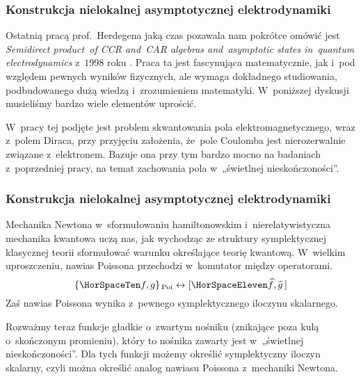 \documentclass[10pt,t]{beamer}
\begin{document}
\begin{frame}
  \frametitle{Konstrukcja nielokalnej asymptotycznej
    elektrodynamiki}


  Ostatnią pracą prof.~Herdegena jaką czas pozawala nam pokrótce omówić
  jest 
  {\textit{Semidirect product~of CCR and~CAR algebras and~asymptotic states
      in~quantum electrodynamics}} z~$1998$ roku
  \parencite{Herdegen-Semidirect-product-of-CCR-and-CAR-algebras-ETC-Pub-1998}.
  Praca ta jest fascynująca matematycznie,
  jak i~pod względem pewnych wyników fizycznych, ale wymaga dokładnego
  studiowania, podbudowanego dużą wiedzą i~zrozumieniem matematyki.
  W~poniższej dyskusji musieliśmy bardzo wiele elementów uprościć.

  W~pracy tej podjęte jest problem skwantowania pola elektromagnetycznego,
  wraz z~polem Diraca, przy przyjęciu założenia, że~pole Coulomba jest
  nierozerwalnie związane z~elektronem. Bazuje ona przy tym bardzo mocno
  na badaniach z~poprzedniej pracy, na temat zachowania pola
  w~„świetlnej nieskończoności”.

\end{frame}





\begin{frame}
  \frametitle{Konstrukcja nielokalnej asymptotycznej
    elektrodynamiki}


  Mechanika Newtona w~sformułowaniu hamiltonowskim i~nierelatywistyczna
  mechanika kwantowa uczą nas, jak wychodząc ze struktury symplektycznej
  klasycznej teorii sformułować warunku określające teorię kwantową.
  W~wielkim uproszczeniu, nawias Poissona przechodzi w~komutator między
  operatorami.
  \begin{equation}
    \label{eq:Wybrane-badania-ETC-01}
    \{ \HorSpaceTen f, g \}_{ \, \text{Poi} } \leftrightarrow
    [ \HorSpaceEleven \widehat{ f }, \widehat{ g } \, ]
  \end{equation}
  Zaś nawias Poissona wynika z~pewnego symplektycznego iloczynu skalarnego.

  Rozważmy teraz funkcje gładkie o~zwartym nośniku (znikające poza kulą
  o~skończonym promieniu), który to nośnika zawarty jest  w~„świetlnej
  nieskończoności”. Dla tych funkcji możemy określić symplektyczny iloczyn
  skalarny, czyli można określić analog nawiasu Poissona z~mechaniki
  Newtona.

\end{frame}
\end{document}
